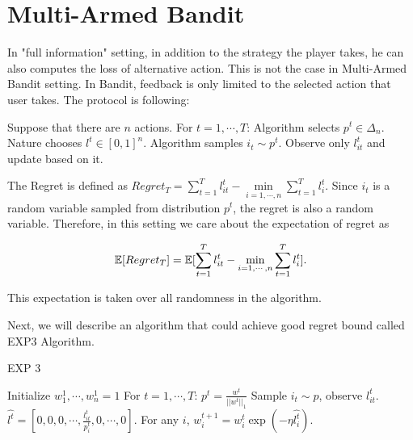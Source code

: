 \documentclass[../main.tex]{subfiles}
\begin{document}
\chapter{Multi-Armed Bandit}

In "full information" setting, in addition to the strategy the player takes, he can also computes the loss of alternative action. This is not the case in Multi-Armed Bandit setting. In Bandit, feedback is only limited to the selected action that user takes. The protocol is following:


\begin{algorithm}
	\begin{algorithmic}
		\STATE Suppose that there are $n$ actions.
		\STATE For $t = 1,\cdots ,T$:
		\bindent 
		\STATE Algorithm selects $p^t \in \Delta_n$.
		\STATE Nature chooses $l^t \in [0,1]^n$.
		\STATE Algorithm samples $i_t \sim p^t$.
		\STATE Observe only $l^t_{it}$ and update based on it.
		\eindent
	\end{algorithmic}
\end{algorithm}

The Regret is defined as $Regret_T = \sum\limits_{t=1}^T l^t_{it} - \min\limits_{i=1,\cdots, n} \sum\limits_{t=1}^T l^t_{i}$. Since $i_t$ is a random variable sampled from distribution $p^t$, the regret is also a random variable. Therefore, in this setting we care about the expectation of regret as

\begin{equation*}
	\begin{aligned}
		\mathbb{E} [Regret_T] = \mathbb{E} [\sum\limits_{t=1}^T l^t_{it} - \min\limits_{i=1,\cdots, n} \sum\limits_{t=1}^T l^t_{i}].
	\end{aligned}
\end{equation*}

This expectation is taken over all randomness in the algorithm.

Next, we will describe an algorithm that could achieve good regret bound called EXP3 Algorithm.

\begin{algorithm}[H]
	\caption{EXP 3}
	\begin{algorithmic}
		\STATE Initialize $w_1^1,\cdots, w_n^1 = 1$
		\STATE For $t = 1,\cdots ,T$:
		\bindent 
		\STATE $p^t = \frac{w^t}{||w^t||_1}$
		\STATE Sample $i_t \sim p$, observe $l_{it}^t$.
		\STATE $\hat{l^t} = [0,0,0,\cdots, \frac{l^t_{it}}{p_i^t}, 0,\cdots,0]$.
		\STATE For any $i$, $w_i^{t+1} = w_i^t \exp(-\eta \hat{l_i^t})$.
		\eindent
	\end{algorithmic}
\end{algorithm}
\end{document}
